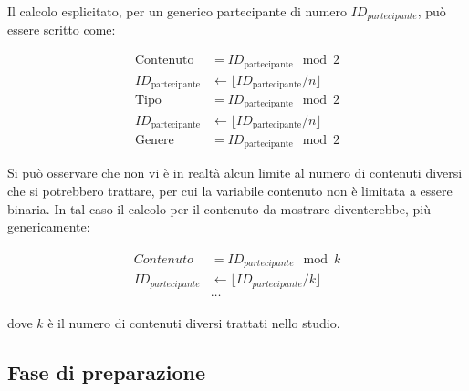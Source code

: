 Il calcolo esplicitato, per un generico partecipante di numero $ID_{partecipante}$, può essere scritto come:

\begin{align}
    \text{Contenuto} &= ID_{\text{partecipante}} \mod 2 \\
    ID_{\text{partecipante}} &\leftarrow \lfloor ID_{\text{partecipante}} / n \rfloor \\
    \text{Tipo} &= ID_{\text{partecipante}} \mod 2 \\
    ID_{\text{partecipante}} &\leftarrow \lfloor ID_{\text{partecipante}} / n \rfloor \\
    \text{Genere} &= ID_{\text{partecipante}} \mod 2
\end{align}

Si può osservare che non vi è in realtà alcun limite al numero di contenuti diversi che si potrebbero trattare, per cui la variabile contenuto non è limitata a essere binaria. In tal caso il calcolo per il contenuto da mostrare diventerebbe, più genericamente:

\begin{align}
    \begin{split}
        Contenuto &= ID_{partecipante} \mod k \\
        ID_{partecipante} &\leftarrow \lfloor ID_{partecipante} / k \rfloor \\
        &\dots
    \end{split}
\end{align}

dove $k$ è il numero di contenuti diversi trattati nello studio.

\subsection{Fase di preparazione}

